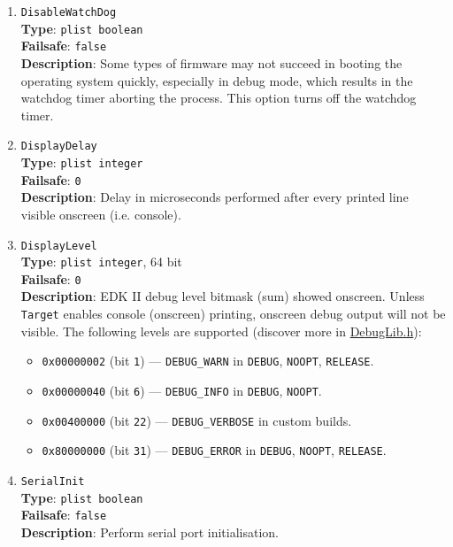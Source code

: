 \documentclass[]{article}
\providecommand{\tightlist}{%
  \setlength{\itemsep}{0pt}\setlength{\parskip}{0pt}}
\begin{document}
\begin{enumerate}
\item
  \texttt{DisableWatchDog}\\
  \textbf{Type}: \texttt{plist\ boolean}\\
  \textbf{Failsafe}: \texttt{false}\\
  \textbf{Description}: Some types of firmware may not succeed in booting
  the operating system quickly, especially in debug mode, which results in the watchdog
  timer aborting the process. This option turns off the watchdog timer.

\item
  \texttt{DisplayDelay}\\
  \textbf{Type}: \texttt{plist\ integer}\\
  \textbf{Failsafe}: \texttt{0}\\
  \textbf{Description}: Delay in microseconds performed after
  every printed line visible onscreen (i.e. console).

\item
  \texttt{DisplayLevel}\\
  \textbf{Type}: \texttt{plist\ integer}, 64 bit\\
  \textbf{Failsafe}: \texttt{0}\\
  \textbf{Description}: EDK II debug level bitmask (sum) showed onscreen.
  Unless \texttt{Target} enables console (onscreen) printing,
  onscreen debug output will not be visible. The following levels
  are supported (discover more in
  \href{https://github.com/acidanthera/audk/blob/master/MdePkg/Include/Library/DebugLib.h}{DebugLib.h}):

  \begin{itemize}
  \tightlist
    \item \texttt{0x00000002} (bit \texttt{1}) --- \texttt{DEBUG\_WARN} in \texttt{DEBUG},
      \texttt{NOOPT}, \texttt{RELEASE}.
    \item \texttt{0x00000040} (bit \texttt{6}) --- \texttt{DEBUG\_INFO} in \texttt{DEBUG},
      \texttt{NOOPT}.
    \item \texttt{0x00400000} (bit \texttt{22}) --- \texttt{DEBUG\_VERBOSE} in custom builds.
    \item \texttt{0x80000000} (bit \texttt{31}) --- \texttt{DEBUG\_ERROR} in \texttt{DEBUG},
      \texttt{NOOPT}, \texttt{RELEASE}.
  \end{itemize}

\item
  \texttt{SerialInit}\\
  \textbf{Type}: \texttt{plist\ boolean}\\
  \textbf{Failsafe}: \texttt{false}\\
  \textbf{Description}: Perform serial port initialisation.


\end{enumerate}
\end{document}
